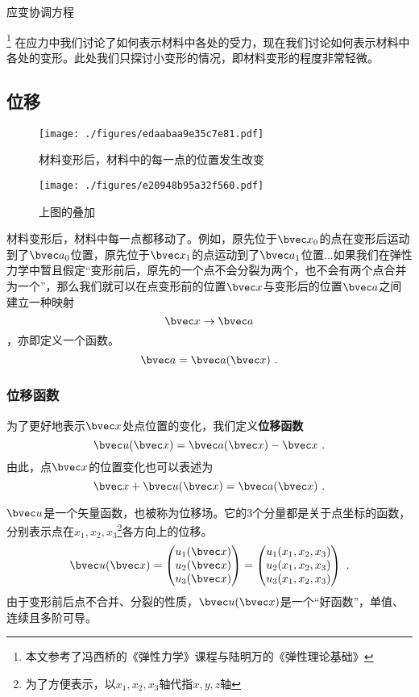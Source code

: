 
\begin{issues}
\issueTODO 
应变协调方程
\end{issues}

\footnote{本文参考了冯西桥的《弹性力学》课程与陆明万的《弹性理论基础》}
在应力中我们讨论了如何表示材料中各处的受力，现在我们讨论如何表示材料中各处的变形。此处我们只探讨小变形的情况，即材料变形的程度非常轻微。
\subsection{位移}
\begin{figure}[ht]
\centering
\texttt{[image: ./figures/edaabaa9e35c7e81.pdf]}
\caption{材料变形后，材料中的每一点的位置发生改变} \label{fig_Strain_1}
\end{figure}
\begin{figure}[ht]
\centering
\texttt{[image: ./figures/e20948b95a32f560.pdf]}
\caption{上图的叠加} \label{fig_Strain_2}
\end{figure}

材料变形后，材料中每一点都移动了。例如，原先位于$\bvec x_0$的点在变形后运动到了$\bvec a_0$位置，原先位于$\bvec x_1$的点运动到了$\bvec a_1$位置...如果我们在弹性力学中暂且假定“变形前后，原先的一个点不会分裂为两个，也不会有两个点合并为一个”，那么我们就可以在点变形前的位置$\bvec x$与变形后的位置$\bvec a$之间建立一种映射$$\bvec x\rightarrow \bvec a$$，亦即定义一个函数。$$\bvec a = \bvec a (\bvec x)~.$$

\subsubsection{位移函数}
为了更好地表示$\bvec x$处点位置的变化，我们定义\textbf{位移函数}
\begin{equation}
\bvec u (\bvec x) =\bvec a (\bvec x) - \bvec x~.
\end{equation}
由此，点$\bvec x$的位置变化也可以表述为
\begin{equation}
\bvec x + \bvec u (\bvec x) =\bvec a (\bvec x) ~.
\end{equation}

$\bvec u$是一个矢量函数，也被称为位移场。它的3个分量都是关于点坐标的函数，分别表示点在$x_1, x_2, x_3$\footnote{为了方便表示，以$x_1, x_2, x_3$轴代指$x,y,z$轴}各方向上的位移。
$$\bvec u(\bvec x) = 
\begin{pmatrix}
u_1(\bvec x)\\
u_2(\bvec x)\\
u_3(\bvec x)\\
\end{pmatrix}
=
\begin{pmatrix}
u_1(x_1, x_2, x_3)\\
u_2(x_1, x_2, x_3)\\
u_3(x_1, x_2, x_3)\\
\end{pmatrix}~.
$$
由于变形前后点不合并、分裂的性质，$\bvec u(\bvec x)$是一个“好函数”，单值、连续且多阶可导。

